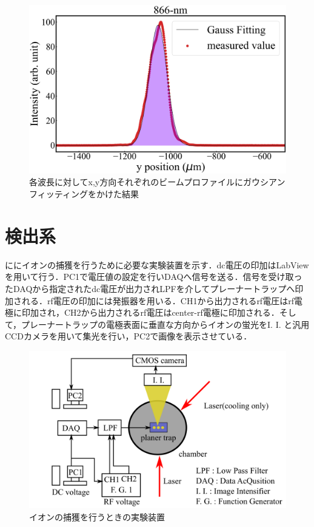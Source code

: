 \begin{figure}[h]
\begin{center}
\begin{minipage}{0.48\linewidth}
\begin{center}
		\includegraphics[width = 0.98\columnwidth]{./experimental_setup/figure/866GaussianFittingYpos.jpg}
	\end{center}
	\end{minipage}
	\caption{各波長に対してx,y方向それぞれのビームプロファイルにガウシアンフィッティングをかけた結果}
	\label{fig:GaussianFitting}
	\end{center}
\end{figure}
%
\clearpage
%
\section{検出系}
ににイオンの捕獲を行うために必要な実験装置を示す．dc電圧の印加はLabViewを用いて行う．PC1で電圧値の設定を行いDAQへ信号を送る．信号を受け取ったDAQから指定されたdc電圧が出力されLPFを介してプレーナートラップへ印加される．rf電圧の印加には発振器を用いる．CH1から出力されるrf電圧はrf電極に印加され，CH2から出力されるrf電圧はcenter-rf電極に印加される．そして，プレーナートラップの電極表面に垂直な方向からイオンの蛍光をI. I. と汎用CCDカメラを用いて集光を行い，PC2で画像を表示させている．

\begin{figure}[h]
	\begin{center}
		\includegraphics[width = 0.6\linewidth]{./experimental_setup/figure/Detect.png}
		\caption{イオンの捕獲を行うときの実験装置}
		\label{fig:Detect}
	\end{center}
\end{figure}